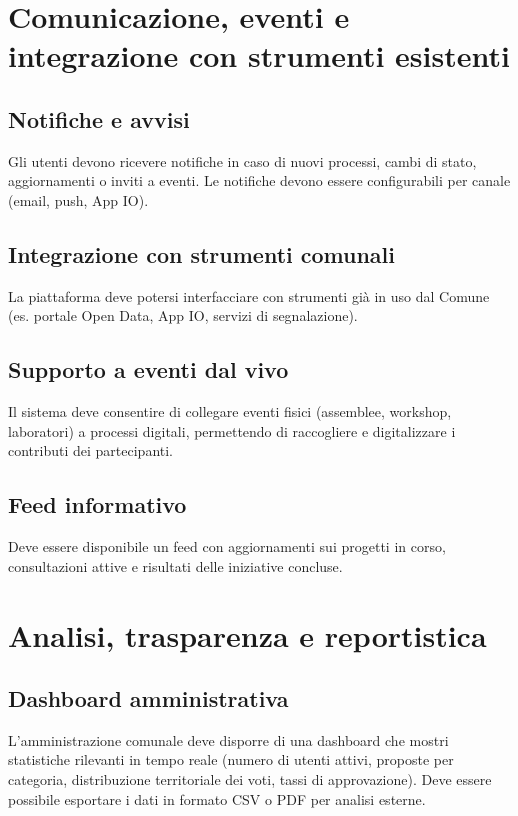 \section{Comunicazione, eventi e integrazione con strumenti esistenti}

\subsection{Notifiche e avvisi}
Gli utenti devono ricevere notifiche in caso di nuovi processi, cambi di stato, aggiornamenti o inviti a eventi.  
Le notifiche devono essere configurabili per canale (email, push, App IO).

\subsection{Integrazione con strumenti comunali}
La piattaforma deve potersi interfacciare con strumenti già in uso dal Comune (es. portale Open Data, App IO, servizi di segnalazione).

\subsection{Supporto a eventi dal vivo}
Il sistema deve consentire di collegare eventi fisici (assemblee, workshop, laboratori) a processi digitali, permettendo di raccogliere e digitalizzare i contributi dei partecipanti.

\subsection{Feed informativo}
Deve essere disponibile un feed con aggiornamenti sui progetti in corso, consultazioni attive e risultati delle iniziative concluse.

\section{Analisi, trasparenza e reportistica}

\subsection{Dashboard amministrativa}
L’amministrazione comunale deve disporre di una dashboard che mostri statistiche rilevanti in tempo reale (numero di utenti attivi, proposte per categoria, distribuzione territoriale dei voti, tassi di approvazione).  
Deve essere possibile esportare i dati in formato CSV o PDF per analisi esterne.

